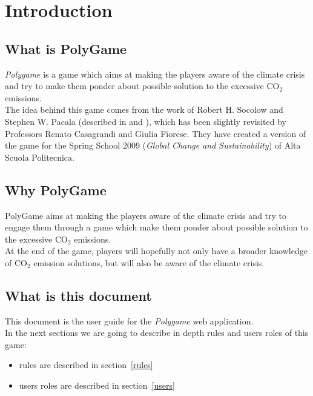 \section{Introduction}

\subsection{What is PolyGame}
\emph{Polygame} is a game which aims at making the players aware of the climate crisis and try to make them ponder about possible solution to the excessive CO$_{2}$ emissions.\\
The idea behind this game comes from the work of Robert H. Socolow and Stephen W. Pacala (described in \cite{scientificAmerican} and \cite{science}), which has been slightly revisited by Professors Renato Casagrandi and Giulia Fiorese. They have created a version of the game for the Spring School 2009 (\emph{Global Change and Sustainability}) of Alta Scuola Politecnica.


\subsection{Why PolyGame}
PolyGame aims at making the players aware of the climate crisis and try to engage them through a game which make them ponder about possible solution to the excessive CO$_{2}$ emissions.\\
At the end of the game, players will hopefully not only have a broader knowledge of CO$_{2}$ emission solutions, but will also be aware of the climate crisis.


\subsection{What is this document}
This document is the user guide for the \emph{Polygame} web application.\\
In the next sections we are going to describe in depth rules and users roles of this game:

\begin{itemize}
\item rules are described in section~\ref{rules}
\item users roles are described in section~\ref{users}
\end{itemize}
